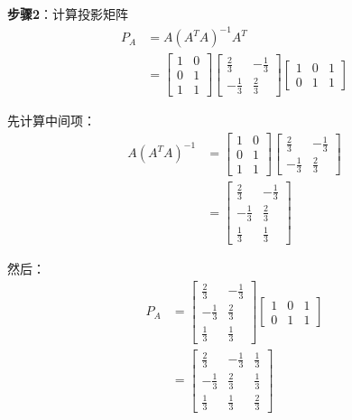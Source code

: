\documentclass[12pt,a4paper]{article}
\begin{document}
\textbf{步骤2}：计算投影矩阵
\begin{align}
P_A &= A (A^T A)^{-1} A^T \\
&= \begin{bmatrix} 1 & 0 \\ 0 & 1 \\ 1 & 1 \end{bmatrix} \begin{bmatrix} \frac{2}{3} & -\frac{1}{3} \\ -\frac{1}{3} & \frac{2}{3} \end{bmatrix} \begin{bmatrix} 1 & 0 & 1 \\ 0 & 1 & 1 \end{bmatrix}
\end{align}

先计算中间项：
\begin{align}
A (A^T A)^{-1} &= \begin{bmatrix} 1 & 0 \\ 0 & 1 \\ 1 & 1 \end{bmatrix} \begin{bmatrix} \frac{2}{3} & -\frac{1}{3} \\ -\frac{1}{3} & \frac{2}{3} \end{bmatrix} \\
&= \begin{bmatrix} \frac{2}{3} & -\frac{1}{3} \\ -\frac{1}{3} & \frac{2}{3} \\ \frac{1}{3} & \frac{1}{3} \end{bmatrix}
\end{align}

然后：
\begin{align}
P_A &= \begin{bmatrix} \frac{2}{3} & -\frac{1}{3} \\ -\frac{1}{3} & \frac{2}{3} \\ \frac{1}{3} & \frac{1}{3} \end{bmatrix} \begin{bmatrix} 1 & 0 & 1 \\ 0 & 1 & 1 \end{bmatrix} \\
&= \begin{bmatrix} \frac{2}{3} & -\frac{1}{3} & \frac{1}{3} \\ -\frac{1}{3} & \frac{2}{3} & \frac{1}{3} \\ \frac{1}{3} & \frac{1}{3} & \frac{2}{3} \end{bmatrix}
\end{align}
\end{document}
